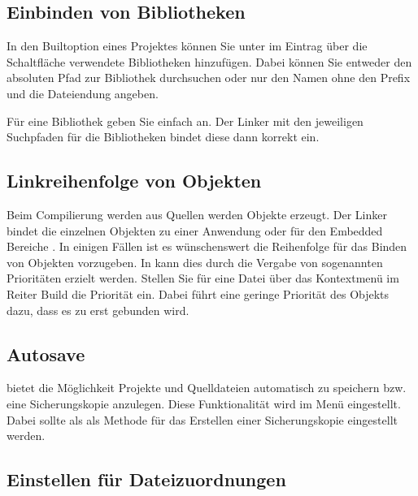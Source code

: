 \subsection{Einbinden von Bibliotheken}

In den Builtoption eines Projektes können Sie unter  im Eintrag  über die Schaltfläche  verwendete Bibliotheken hinzufügen. Dabei können Sie entweder den absoluten Pfad zur Bibliothek durchsuchen oder nur den Namen ohne den Prefix  und die Dateiendung angeben.


Für eine Bibliothek  geben Sie einfach  an. Der Linker mit den jeweiligen Suchpfaden für die Bibliotheken bindet diese dann korrekt ein.


\subsection{Linkreihenfolge von Objekten}

Beim Compilierung werden aus Quellen  werden Objekte  erzeugt. Der Linker bindet die einzelnen Objekten zu einer Anwendung  oder für den Embedded Bereiche . In einigen Fällen ist es wünschenswert die Reihenfolge für das Binden von Objekten vorzugeben. In \codeblocks kann dies durch die Vergabe von sogenannten Prioritäten erzielt werden. Stellen Sie für eine Datei über das Kontextmenü  im Reiter Build die Priorität ein. Dabei führt eine geringe Priorität des Objekts dazu, dass es zu erst gebunden wird.

\subsection{Autosave}

\codeblocks bietet die Möglichkeit Projekte und Quelldateien automatisch zu speichern bzw. eine Sicherungskopie anzulegen. Diese Funktionalität wird im Menü  eingestellt. Dabei sollte als  als Methode für das Erstellen einer Sicherungskopie eingestellt werden.

\subsection{Einstellen für Dateizuordnungen}\label{sec:file_extension}

